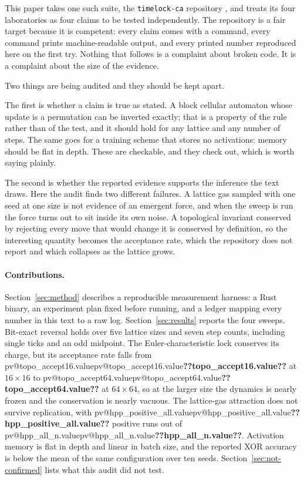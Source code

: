 \documentclass[11pt,a4paper]{article}
\makeatletter
\newcommand{\val}[1]{\ifcsname pv@#1\endcsname\csname pv@#1\endcsname\else\textbf{??#1??}\fi}
\makeatother
\begin{document}
This paper takes one such suite, the \texttt{timelock-ca} repository \citep{timelockca}, and
treats its four laboratories as four claims to be tested independently. The repository is a fair
target because it is competent: every claim comes with a command, every command prints
machine-readable output, and every printed number reproduced here on the first try. Nothing that
follows is a complaint about broken code. It is a complaint about the size of the evidence.

Two things are being audited and they should be kept apart.

The first is whether a claim is true as stated. A block cellular automaton whose update is a
permutation can be inverted exactly; that is a property of the rule rather than of the test, and
it should hold for any lattice and any number of steps. The same goes for a training scheme that
stores no activations: memory should be flat in depth. These are checkable, and they check out,
which is worth saying plainly.

The second is whether the reported evidence supports the inference the text draws. Here the
audit finds two different failures. A lattice gas sampled with one seed at one size is not
evidence of an emergent force, and when the sweep is run the force turns out to sit inside its
own noise. A topological invariant conserved by rejecting every move that would change it is
conserved by definition, so the interesting quantity becomes the acceptance rate, which the
repository does not report and which collapses as the lattice grows.

\paragraph{Contributions.}
Section~\ref{sec:method} describes a reproducible measurement harness: a Rust binary, an
experiment plan fixed before running, and a ledger mapping every number in this text to a raw
log. Section~\ref{sec:results} reports the four sweeps. Bit-exact reversal holds over five
lattice sizes and seven step counts, including single ticks and an odd midpoint. The
Euler-characteristic lock conserves its charge, but its acceptance rate falls from
\val{topo_accept16.value} at $16\times16$ to \val{topo_accept64.value} at $64\times64$, so at the
larger size the dynamics is nearly frozen and the conservation is nearly vacuous. The
lattice-gas attraction does not survive replication, with \val{hpp_positive_all.value} positive
runs out of \val{hpp_all_n.value}. Activation memory is flat in depth and linear in batch size,
and the reported XOR accuracy is below the mean of the same configuration over ten seeds.
Section~\ref{sec:not-confirmed} lists what this audit did not test.
\end{document}
